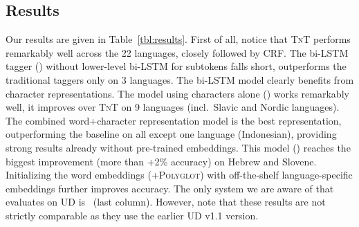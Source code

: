 \documentclass[11pt]{article}
\begin{document}
\begin{table}
\caption{Grouping of languages.}
\label{tbl:lang}
\end{table}





\subsection{Results}


Our results are given in Table~\ref{tbl:results}. First of all, notice that \textsc{TnT} performs remarkably well across the 22 languages, closely followed by CRF. The bi-LSTM
tagger () without lower-level bi-LSTM for subtokens falls short, outperforms the traditional taggers only on 3 languages. The bi-LSTM model clearly benefits from character 
representations. The model using characters alone () works remarkably well, it improves over \textsc{TnT} on 9 languages (incl.\ Slavic and Nordic languages). The combined word+character representation
model is the best representation, outperforming the baseline on all except one language (Indonesian), providing strong results already without pre-trained embeddings. This model () reaches the biggest improvement (more than +2\% accuracy) on Hebrew and Slovene. 
 Initializing the word embeddings (+\textsc{Polyglot}) with off-the-shelf language-specific embeddings further improves accuracy.  
 The only system we are aware of that evaluates on UD is~ (last column). However, note that these results are not strictly comparable as they use the earlier UD v1.1 version.
\end{document}
